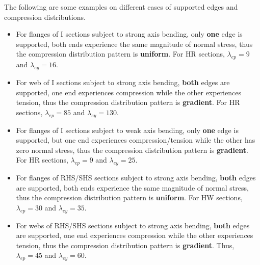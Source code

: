 The following are some examples on different cases of supported edges and compression distributions.
\begin{itemize}
\item For flanges of I sections subject to strong axis bending, only \textbf{one} edge is supported, both ends experience the same magnitude of normal stress, thus the compression distribution pattern is \textbf{uniform}.
For HR sections, $\lambda_{ep}=9$ and $\lambda_{ey}=16$.
\begin{figure}[H]
\centering

\end{figure}
\item For web of I sections subject to strong axis bending, \textbf{both} edges are supported, one end experiences compression while the other experiences tension, thus the compression distribution pattern is \textbf{gradient}.
For HR sections, $\lambda_{ep}=85$ and $\lambda_{ey}=130$.
\begin{figure}[H]
\centering

\end{figure}
\item For flanges of I sections subject to weak axis bending, only \textbf{one} edge is supported, but one end experiences compression/tension while the other has zero normal stress, thus the compression distribution pattern is \textbf{gradient}.
For HR sections, $\lambda_{ep}=9$ and $\lambda_{ey}=25$.
\begin{figure}[H]
\centering

\end{figure}
\item For flanges of RHS/SHS sections subject to strong axis bending, \textbf{both} edges are supported, both ends experience the same magnitude of normal stress, thus the compression distribution pattern is \textbf{uniform}.
For HW sections, $\lambda_{ep}=30$ and $\lambda_{ey}=35$.
\begin{figure}[H]
\centering

\end{figure}
\item For webs of RHS/SHS sections subject to strong axis bending, \textbf{both} edges are supported, one end experiences compression while the other experiences tension, thus the compression distribution pattern is \textbf{gradient}.
Thus, $\lambda_{ep}=45$ and $\lambda_{ey}=60$.
\begin{figure}[H]
\centering

\end{figure}
\end{itemize}

